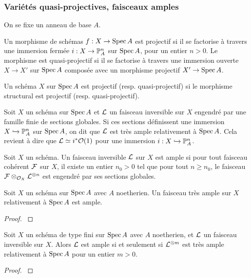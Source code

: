 \subsubsection{Variétés quasi-projectives, faisceaux amples}

\noindent On se fixe un anneau de base $A$.

\begin{defn}
Un morphisme de schémas $f:X\rightarrow \operatorname{Spec} A$ est projectif si il se factorise à travers une immersion fermée $i:X\rightarrow \mathbb{P}_A^n$ sur $\operatorname{Spec} A$, pour un entier $n>0$. Le morphisme est quasi-projectif si il se factorise à travers une immersion ouverte $X\rightarrow X'$ sur $\operatorname{Spec} A$ composée avec un morphisme projectif $X'\rightarrow \operatorname{Spec} A$.
\end{defn}


\begin{defn}
Un schéma $X$ sur $\operatorname{Spec} A$ est projectif (resp. quasi-projectif) si le morphisme structural est projectif (resp. quasi-projectif).
\end{defn}

\begin{defn}
Soit $X$ un schéma sur $\operatorname{Spec} A$ et $\mathcal{L}$ un faisceau inversible sur $X$ engendré par une famille finie de sections globales. Si ces sections définissent une immersion $X\xhookrightarrow{}\mathbb{P}_A^n$ sur $\operatorname{Spec} A$, on dit que $\mathcal{L}$ est très ample relativement à $\operatorname{Spec} A$. Cela revient à dire que $\mathcal{L}\simeq i^*\mathcal{O}(1)$  pour une immersion $i:X\xhookrightarrow{}\mathbb{P}_A^n$.
\end{defn}

\begin{defn}
Soit $X$ un schéma. Un faisceau inversible $\mathcal{L}$ sur $X$ est ample si pour tout faisceau cohérent $\mathcal{F}$ sur $X$, il existe un entier $n_0>0$ tel que pour tout $n\geq n_0$, le faisceau $\mathcal{F}\otimes_{\mathcal{O}_X}\mathcal{L}^{\otimes n}$ est engendré par ses sections globales.
\end{defn}

\begin{prop}
Soit $X$ un schéma sur $\operatorname{Spec} A$ avec $A$ noetherien. Un faisceau très ample sur $X$ relativement à $\operatorname{Spec} A$ est ample.
\end{prop}
\begin{proof}
\cite[II.5.17]{Hartshorne} 
\end{proof}

\begin{thm}
Soit $X$ un schéma de type fini sur $\operatorname{Spec} A$ avec $A$ noetherien, et $\mathcal{L}$ un faisceau inversible sur $X$. Alors $\mathcal{L}$ est ample si et seulement si $\mathcal{L}^{\otimes m}$ est très ample relativement à $\operatorname{Spec} A$ pour un entier $m>0$.
\end{thm}
\begin{proof}
\cite[II.7.6]{Hartshorne}
\end{proof}


